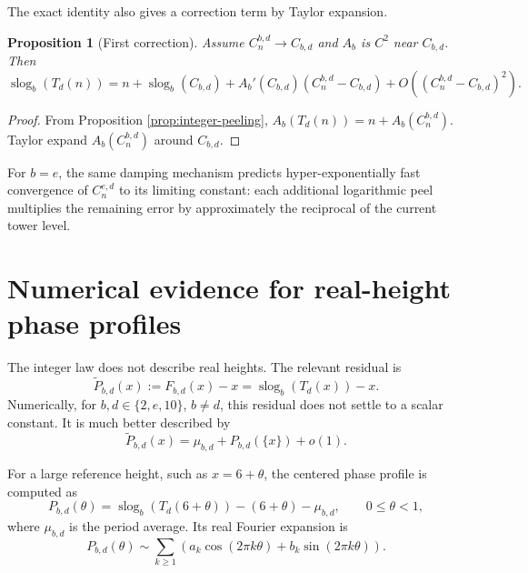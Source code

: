 \documentclass[11pt,a4paper]{article}
\theoremstyle{plain}
\newtheorem{proposition}[theorem]{Proposition}
\theoremstyle{definition}
\theoremstyle{remark}
\newcommand{\slog}{\operatorname{slog}}
\begin{document}
The exact identity also gives a correction term by Taylor expansion.

\begin{proposition}[First correction]\label{prop:first-correction}
Assume $C_n^{b,d}\to C_{b,d}$ and $A_b$ is $C^2$ near $C_{b,d}$.  Then
\begin{equation}\label{eq:first-correction}
  \slog_b(T_d(n))=n+\slog_b(C_{b,d})+A_b'(C_{b,d})(C_n^{b,d}-C_{b,d})+O((C_n^{b,d}-C_{b,d})^2).
\end{equation}
\end{proposition}

\begin{proof}
From Proposition \ref{prop:integer-peeling}, $A_b(T_d(n))=n+A_b(C_n^{b,d})$.  Taylor expand $A_b(C_n^{b,d})$ around $C_{b,d}$.
\end{proof}

For $b=e$, the same damping mechanism predicts hyper-exponentially fast convergence of $C_n^{e,d}$ to its limiting constant: each additional logarithmic peel multiplies the remaining error by approximately the reciprocal of the current tower level.

\section{Numerical evidence for real-height phase profiles}

The integer law does not describe real heights.  The relevant residual is
\begin{equation}\label{eq:raw-residual}
  \widetilde P_{b,d}(x):=F_{b,d}(x)-x=\slog_b(T_d(x))-x.
\end{equation}
Numerically, for $b,d\in\{2,e,10\}$, $b\ne d$, this residual does not settle to a scalar constant.  It is much better described by
\begin{equation}\label{eq:numeric-phase-model}
  \widetilde P_{b,d}(x)=\mu_{b,d}+P_{b,d}(\{x\})+o(1).
\end{equation}

For a large reference height, such as $x=6+\theta$, the centered phase profile is computed as
\begin{equation}\label{eq:centered-profile}
  P_{b,d}(\theta)=\slog_b(T_d(6+\theta))-(6+\theta)-\mu_{b,d},\qquad 0\leq\theta<1,
\end{equation}
where $\mu_{b,d}$ is the period average.  Its real Fourier expansion is
\begin{equation}\label{eq:fourier-real}
  P_{b,d}(\theta)\sim\sum_{k\geq1}\left(a_k\cos(2\pi k\theta)+b_k\sin(2\pi k\theta)\right).
\end{equation}
\end{document}
